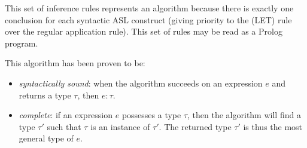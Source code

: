 %
This set of inference rules represents an algorithm because there is
exactly one conclusion for each syntactic ASL construct (giving priority to
the (LET) rule over the regular application rule). This set of rules
may be read as a Prolog program.

%
This algorithm has been proven to be:
\begin{itemize}
\item {\em syntactically sound}\/: when the algorithm succeeds on an
expression $e$ and returns a type $\tau$, then $e:\tau$.
\item {\em complete}\/: if an expression $e$ possesses a type $\tau$, then the
algorithm will find a type $\tau'$ such that $\tau$ is an instance of
$\tau'$. The returned type $\tau'$ is thus the most general type of $e$.
\end{itemize}

